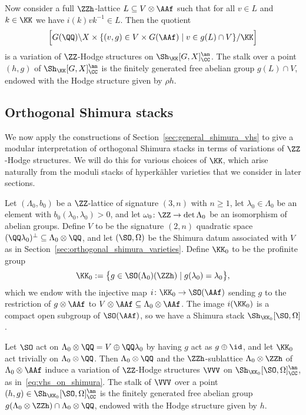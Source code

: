 Now consider a full $\ZZh$-lattice $L \subseteq V \otimes \AAf$ such that for all $v \in L$ and $k \in \KK$ we have $ i (k) v k^{-1} \in L$. Then the quotient
\begin{equation}\label{eq:vhs_on_shimura}
\Big[ G(\QQ) \backslash X \times \{(v, g) \in V \times G(\AAf) \mid v \in g(L) \cap V \}/\KK \Big]
\end{equation}
is a variation of $\ZZ$-Hodge structures on $\Sh_{\KK}[G,X]^{\an}_{\CC}$. The stalk over a point $(h,g)$ of $\Sh_{\KK}[G,X]_{\CC}^{\an}$ is the finitely generated free abelian group $g(L) \cap V$, endowed with the Hodge structure given by $\rho h$.

\subsection{Orthogonal Shimura stacks}\label{sec:orthogonal_shimura_vhs}
We now apply the constructions of Section~\ref{sec:general_shimura_vhs} to give a modular interpretation of orthogonal Shimura stacks in terms of variations of $\ZZ$-Hodge structures. We will do this for various choices of $\KK$, which arise naturally from the moduli stacks of hyperk\"ahler varieties that we consider in later sections.

Let $(\Lambda_0,b_0)$ be a $\ZZ$-lattice of signature $(3,n)$ with $n \geq 1$, let $\lambda_0 \in \Lambda_0$ be an element with $b_0(\lambda_0,\lambda_0) > 0$, and let $\omega_0\colon \ZZ \rightarrow \det \Lambda_0$ be an isomorphism of abelian groups. Define $V$ to be the signature $(2,n)$ quadratic space $(\QQ \lambda_0)^{\perp} \subseteq \Lambda_0 \otimes \QQ$, and let $(\SO,\Omega)$ be the Shimura datum associated with $V$ as in Section~\ref{sec:orthogonal_shimura_varieties}. Define $\KK_0$ to be the profinite group
$$
\KK_0 := \big\{ g \in \SO(\Lambda_0)(\ZZh) \mid g(\lambda_0) = \lambda_0 \big\},
$$
which we endow with the injective map $i\colon \KK_0 \rightarrow \SO(\AAf)$ sending $g$ to the restriction of $g \otimes \AAf$ to $V \otimes \AAf \subseteq \Lambda_0 \otimes \AAf$. The image $i(\KK_0)$ is a compact open subgroup of $\SO(\AAf)$, so we have a Shimura stack $\Sh_{\KK_0}[\SO,\Omega]$.

Let $\SO$ act on $\Lambda_0 \otimes \QQ = V \oplus \QQ \lambda_0$ by having $g$ act as $g \oplus \id$, and let $\KK_0$ act trivially on $\Lambda_0 \otimes \QQ$. Then $\Lambda_0 \otimes \QQ$ and the $\ZZh$-sublattice $\Lambda_0 \otimes \ZZh$ of $\Lambda_0 \otimes \AAf$ induce a variation of $\ZZ$-Hodge structures $\VVV$ on $\Sh_{\KK_0}[\SO,\Omega]^{\an}_{\CC}$, as in~\eqref{eq:vhs_on_shimura}. The stalk of $\VVV$ over a point $(h,g) \in \Sh_{\KK_0}[\SO,\Omega]_{\CC}^{\an}$ is the finitely generated free abelian group $g(\Lambda_0 \otimes \ZZh) \cap \Lambda_0 \otimes \QQ$, endowed with the Hodge structure given by $h$.

